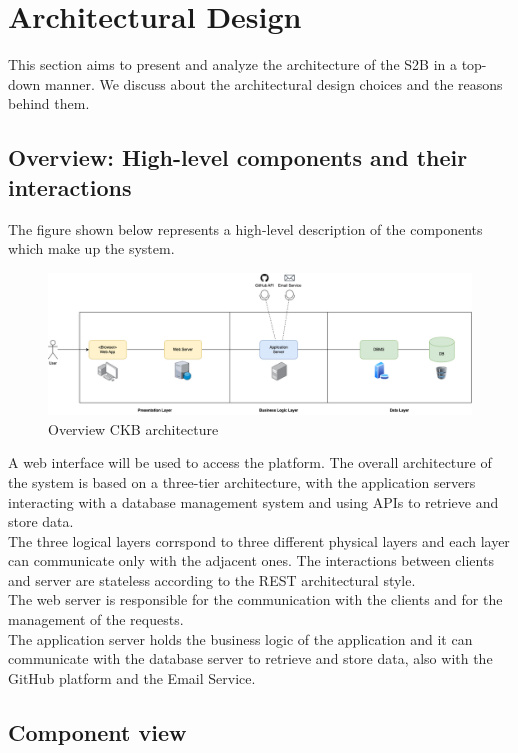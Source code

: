 \chapter{Architectural Design}
This section aims to present and analyze the architecture of the S2B in a top-down manner. 
We discuss about the architectural design choices and the reasons behind them. 

\section{Overview: High-level components and their interactions}
The figure shown below represents a high-level description of the components which make up the system.
\begin{figure}[H]
    \centering
    \includegraphics[width=\textwidth]{images/component_view/high_level.png}
    \caption{Overview CKB architecture}
    \label{fig:CKB Architecture}
\end{figure}
A web interface will be used to access the platform. 
The overall architecture of the system is based on a three-tier architecture, 
with the application servers interacting with a database management system and
using APIs to retrieve and store data. \\
The three logical layers corrspond to three different physical layers and each layer can communicate only with the adjacent ones.
The interactions between clients and server are stateless according to the REST architectural style. \\
The web server is responsible for the communication with the clients and for the management of the requests. \\
The application server holds the business logic of the application and it can communicate with the database server to retrieve and store data, also with the GitHub platform and the Email Service. 

\section{Component view}

